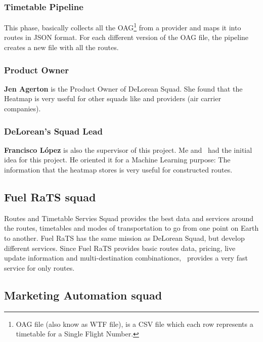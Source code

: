 \subsubsection*{Timetable Pipeline} \label{timetable_pipeline}

This phase, basically collects all the OAG\footnote{OAG file (also know as WTF file), is a CSV\cite{csv} file which each row represents a timetable for a Single Flight Number.} from a provider and maps it into routes in JSON\cite{json} format. For each different version of the OAG file, the pipeline creates a new file with all the routes.

\subsubsection*{Product Owner} \label{product_owner}

\textbf{Jen Agerton} is the Product Owner of DeLorean Squad. She found that the Heatmap is very useful for other squads like  and providers (air carrier companies).

\subsubsection*{DeLorean's Squad Lead}

\textbf{Francisco López} is also the supervisor of this project. Me and \supervisor\ had the initial idea for this project. He oriented it for a Machine Learning purpose: The information that the heatmap stores is very useful for constructed routes.

\subsection{Fuel RaTS squad}

Routes and Timetable Servies Squad provides the best data and services around the routes, timetables and modes of transportation to go from one point on Earth to another. Fuel RaTS has the same mission as DeLorean Squad, but develop different services. Since Fuel RaTS provides basic routes data, pricing, live update information and multi-destination combinationcs, \squad\ provides a very fast service for only routes.

\subsection{Marketing Automation squad} \label{mas}

